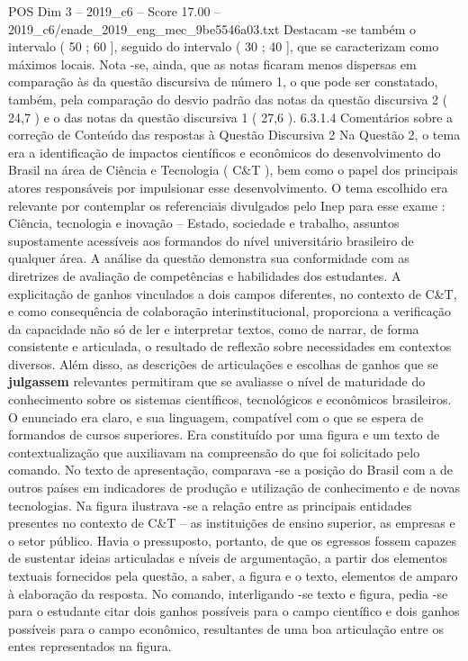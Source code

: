 \begin{textsample}{POS Dim 3 – 2019\_c6 – Score 17.00 – 2019\_c6/enade\_2019\_eng\_mec\_9be5546a03.txt}
Destacam -se também o intervalo ( 50 ; 60 ], seguido do intervalo ( 30 ; 40 ], que se caracterizam como máximos locais.
Nota -se, ainda, que as notas ficaram menos dispersas em comparação às da questão discursiva de número 1, o que pode ser constatado, também, pela comparação do desvio padrão das notas da questão discursiva 2 ( 24,7 ) e o das notas da questão discursiva 1 ( 27,6 ). 6.3.1.4 Comentários sobre a correção de Conteúdo das respostas à Questão Discursiva 2 Na Questão 2, o tema era a identificação de impactos científicos e econômicos do desenvolvimento do Brasil na área de Ciência e Tecnologia ( C\&T ), bem como o papel dos principais atores responsáveis por impulsionar esse desenvolvimento.
O tema escolhido era relevante por contemplar os referenciais divulgados pelo Inep para esse exame : Ciência, tecnologia e inovação – Estado, sociedade e trabalho, assuntos supostamente acessíveis aos formandos do nível universitário brasileiro de qualquer área.
A análise da questão demonstra sua conformidade com as diretrizes de avaliação de competências e habilidades dos estudantes.
A explicitação de ganhos vinculados a dois campos diferentes, no contexto de C\&T, e como consequência de colaboração interinstitucional, proporciona a verificação da capacidade não só de ler e interpretar textos, como de narrar, de forma consistente e articulada, o resultado de reflexão sobre necessidades em contextos diversos.
Além disso, as descrições de articulações e escolhas de ganhos que se \textbf{julgassem} relevantes permitiram que se avaliasse o nível de maturidade do conhecimento sobre os sistemas científicos, tecnológicos e econômicos brasileiros.
O enunciado era claro, e sua linguagem, compatível com o que se espera de formandos de cursos superiores.
Era constituído por uma figura e um texto de contextualização que auxiliavam na compreensão do que foi solicitado pelo comando.
No texto de apresentação, comparava -se a posição do Brasil com a de outros países em indicadores de produção e utilização de conhecimento e de novas tecnologias.
Na figura ilustrava -se a relação entre as principais entidades presentes no contexto de C\&T – as instituições de ensino superior, as empresas e o setor público.
Havia o pressuposto, portanto, de que os egressos fossem capazes de sustentar ideias articuladas e níveis de argumentação, a partir dos elementos textuais fornecidos pela questão, a saber, a figura e o texto, elementos de amparo à elaboração da resposta.
No comando, interligando -se texto e figura, pedia -se para o estudante citar dois ganhos possíveis para o campo científico e dois ganhos possíveis para o campo econômico, resultantes de uma boa articulação entre os entes representados na figura.

\end{textsample}

